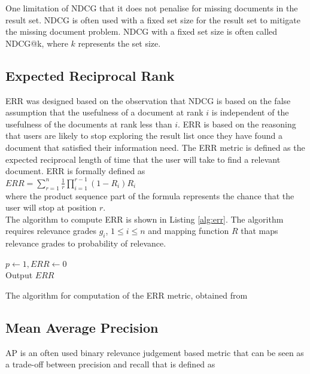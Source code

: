 One limitation of \ac{NDCG} that it does not penalise for missing documents in the result set. \acl{NDCG} is often used with a fixed set size for the result set to mitigate the missing document problem. \ac{NDCG} with a fixed set size is often called \ac{NDCG}@k, where $k$ represents the set size.

\subsection{Expected Reciprocal Rank}
\ac{ERR} \cite{Chapelle2009} was designed based on the observation that \ac{NDCG} is based on the false assumption that the usefulness of a document at rank $i$ is independent of the usefulness of the documents at rank less than $i$. \ac{ERR} is based on the reasoning that users are likely to stop exploring the result list once they have found a document that satisfied their information need. The \ac{ERR} metric is defined as the expected reciprocal length of time that the user will take to find a relevant document. \ac{ERR} is formally defined as\\

$ERR = \sum\nolimits_{r=1}^n \frac{1}{r} \prod\nolimits_{i=1}^{r-1}(1-R_i)R_i$\\

where the product sequence part of the formula represents the chance that the user will stop at position $r$.\\
The algorithm to compute \ac{ERR} is shown in Listing \ref{alg:err}. The algorithm requires relevance grades $g_i$, $1 \le i \le n$ and mapping function $R$ that maps relevance grades to probability of relevance.

\LinesNumbered
\begin{algorithm}[H]
 $p \leftarrow 1, ERR \leftarrow 0$\\
 Output $ERR$
 \caption{The algorithm for computation of the \acs{ERR} metric, obtained from \cite{Chapelle2009}}
 \label{alg:err}
\end{algorithm}

\subsection{Mean Average Precision}
\ac{AP} \cite{Zhu2004} is an often used binary relevance judgement based metric that can be seen as a trade-off between precision and recall that is defined as\\

